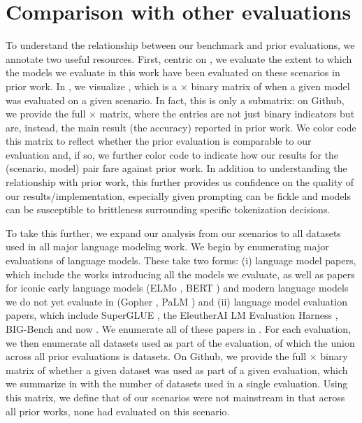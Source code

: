 \hypertarget{benchmark-comparison}{\section{Comparison with other evaluations}}
\label{app:benchmark-comparison}

To understand the relationship between our benchmark and prior evaluations, we annotate two useful resources.
First, centric on \benchmarkname, we evaluate the extent to which the \nummodels models we evaluate in this work have been evaluated on these scenarios in prior work. 
In , we visualize , which is a \numcorescenarios $\times$ \numtextmodels binary matrix of when a given model was evaluated on a given scenario. 
In fact, this is only a submatrix: on Github, we provide the full \numscenarios $\times$ \nummodels matrix, where the entries are not just binary indicators but are, instead, the main result (\eg the accuracy) reported in prior work.
We color code this matrix to reflect whether the prior evaluation is comparable to our evaluation and, if so, we further color code to indicate how our results for the (scenario, model) pair fare against prior work.
In addition to understanding the relationship with prior work, this further provides us confidence on the quality of our results/implementation, especially given prompting can be fickle and models can be susceptible to brittleness surrounding specific tokenization decisions. 


To take this further, we expand our analysis from our \numscenarios scenarios to all datasets used in all major language modeling work.
We begin by enumerating major evaluations of language models.
These take two forms: 
(i) language model papers, which include the works introducing all the models we evaluate, as well as papers for iconic early language models (\eg ELMo \citep{peters2018elmo}, BERT \citep{devlin2019bert}) and modern language models we do not yet evaluate in \benchmarkname (\eg Gopher \citep{rae2021gopher}, PaLM \citep{chowdhery2022palm})
and
(ii) language model evaluation papers, which include SuperGLUE \citep{wang2019superglue}, the EleutherAI LM Evaluation Harness \citep{gao2021harness}, BIG-Bench \citep{srivastava2022bigbench} and now \benchmarkname. 
We enumerate all of these papers in .
For each evaluation, we then enumerate all datasets used as part of the evaluation, of which the union across all \numpriorevaluations prior evaluations is \numlmdatasets datasets.
On Github, we provide the full \numlmdatasets $\times$ \numpriorevaluations binary matrix of whether a given dataset was used as part of a given evaluation, which we summarize in  with the number of datasets used in a single evaluation. 
Using this matrix, we define that \numnewscenarios of our scenarios were not mainstream in that across all \numpriorevaluations prior works, none had evaluated on this scenario. 
